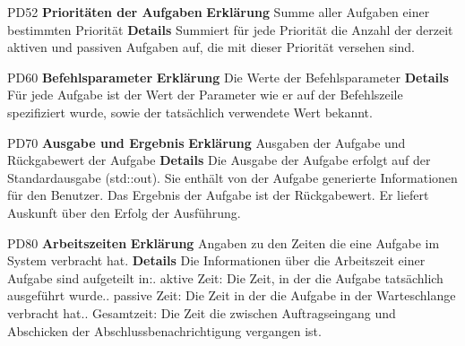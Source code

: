 \documentclass[a4paper,12pt]{article}
\begin{document}
\begin{itemize}[nosep]
\begin{minipage}[t]{\linewidth}
\item[PD52] \textbf{Prioritäten der Aufgaben}
\subitem \textbf{Erklärung} Summe aller Aufgaben einer bestimmten Priorität
\subitem \textbf{Details} Summiert für jede Priorität die Anzahl der derzeit aktiven und passiven Aufgaben auf, die mit dieser Priorität versehen sind.
\end{minipage}
\vspace{20mm}

\begin{minipage}[t]{\linewidth}
\item[PD60] \textbf{Befehlsparameter}
\subitem \textbf{Erklärung} Die Werte der Befehlsparameter
\subitem \textbf{Details} Für jede Aufgabe ist der Wert der Parameter wie er auf der Befehlszeile spezifiziert wurde, sowie der tatsächlich verwendete Wert bekannt.
\end{minipage}
\vspace{20mm}

\begin{minipage}[t]{\linewidth}
\item[PD70] \textbf{Ausgabe und Ergebnis}
\subitem \textbf{Erklärung} Ausgaben der Aufgabe und Rückgabewert der Aufgabe
\subitem \textbf{Details} Die Ausgabe der Aufgabe erfolgt auf der Standardausgabe (std::out). Sie enthält von der Aufgabe generierte Informationen für den Benutzer.\newline
Das Ergebnis der Aufgabe ist der Rückgabewert. Er liefert Auskunft über den Erfolg der Ausführung.
\end{minipage}
\vspace{20mm}

\begin{minipage}[t]{\linewidth}
\item[PD80] \textbf{Arbeitszeiten}
\subitem \textbf{Erklärung} Angaben zu den Zeiten die eine Aufgabe im System verbracht hat.
\subitem \textbf{Details} Die Informationen über die Arbeitszeit einer Aufgabe sind aufgeteilt in:. aktive Zeit: Die Zeit, in der die Aufgabe tatsächlich ausgeführt wurde.. passive Zeit: Die Zeit in der die Aufgabe in der Warteschlange verbracht hat.. Gesamtzeit: Die Zeit die zwischen Auftragseingang und Abschicken der Abschlussbenachrichtigung vergangen ist.
\end{minipage}
\vspace{20mm}


\end{itemize}
\end{document}
